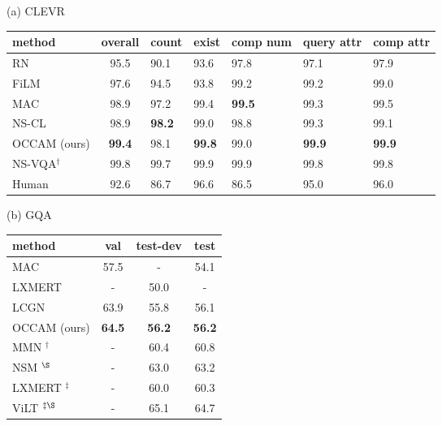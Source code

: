 \documentclass[10pt,twocolumn,letterpaper]{article}
\begin{document}
\begin{figure*}
  \begin{minipage}[b]{0.55\textwidth}
\small
\centering
(a) CLEVR
\begin{tabular}{l|c|p{0.45cm}p{0.45cm}p{0.53cm}p{0.53cm}p{0.53cm}}
        \toprule
         method & overall & count & exist & comp num & query attr & comp attr  \\
         \midrule
         RN \cite{santoro2017simple} & 95.5 & 90.1 & 93.6 & 97.8 & 97.1 & 97.9 \\
         FiLM \cite{perez2018film} & 97.6 & 94.5 & 93.8 & 99.2 & 99.2 & 99.0 \\
         MAC \cite{hudson2018compositional} & 98.9 & 97.2 & 99.4 & \textbf{99.5} & 99.3 & 99.5 \\
         NS-CL \cite{mao2018neuro} & 98.9 & \textbf{98.2} & 99.0 & 98.8 & 99.3 & 99.1\\
OCCAM (ours) & \textbf{99.4}&98.1&\textbf{99.8}&99.0&\textbf{99.9}&\textbf{99.9}\\
         \midrule
NS-VQA$^{\dagger}$ \cite{yi2018neural} & {99.8} & {99.7} & {99.9} & {99.9} & {99.8} & {99.8}\\ 
         \midrule
         Human \cite{johnson2017inferring} & 92.6 & 86.7 & 96.6 & 86.5 & 95.0 & 96.0 \\
         \bottomrule
    \end{tabular}
\end{minipage}
\begin{minipage}[b]{0.37\textwidth}
  \small
    \centering
    (b) GQA
\small
    \begin{tabular}{l|c|c|c}
        \toprule
         method  & val & test-dev & test  \\
         \midrule
MAC \cite{andreas2016neural} & 57.5 & - & 54.1 \\
         LXMERT \cite{tan2019lxmert}  & - & 50.0 & - \\
         LCGN \cite{hu2019language}  & 63.9 & 55.8 & 56.1 \\ 
         OCCAM (ours)  & \bf 64.5 & \bf 56.2 & \bf 56.2\\ 
         \midrule
         MMN \cite{chen2021meta}$^{\dagger}$ & - & 60.4 & 60.8 \\
         NSM \cite{hudson2019learning}$^{\S}$ & - & 63.0 & 63.2 \\
         LXMERT \cite{tan2019lxmert}$^{\ddagger}$ & - & 60.0 & 60.3 \\
         ViLT \cite{kim2021vilt}$^{\ddagger\S}$  & - & 65.1 & 64.7 \\
         \bottomrule
    \end{tabular}
\end{minipage}
    \vspace{-3mm}
  \end{figure*}
\end{document}
